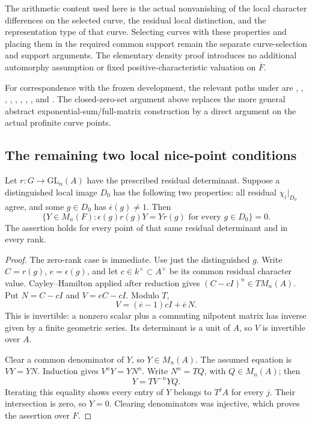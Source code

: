 The arithmetic content used here is the actual nonvanishing
of the local character differences on the selected curve,
the residual local distinction, and the representation type
of that curve.  Selecting curves with these properties and
placing them in the required common support remain the
separate curve-selection and support arguments.
The elementary density proof introduces no additional
automorphy assumption or fixed positive-characteristic
valuation on \(\overline F\).

For correspondence with the frozen development, the relevant
paths under  are
, , ,
, ,
, ,
, and
.
The closed-zero-set argument above replaces the more general
abstract exponential-sum/full-matrix construction by a direct
argument on the actual profinite curve points.


\subsection{The remaining two local nice-point conditions}
\begin{srproposition}
\label{prop:sr-curve-N4}
Let \(r:G\to\mathrm{GL}_n(A)\) have the prescribed residual
determinant. Suppose a distinguished local image \(D_0\)
has the following two properties:
all residual \(\chi_i|_{D_0}\) agree, and some \(g\in D_0\)
has \(\overline\epsilon(g)\ne1\).
Then
\[
 \{Y\in M_n(F):
      \epsilon(g)r(g)Y=Yr(g)\text{ for every }g\in D_0\}=0.
\]
The assertion holds for every point of that same residual
determinant and in every rank.
\end{srproposition}
\begin{proof}
The zero-rank case is immediate.
Use just the distinguished \(g\).
Write \(C=r(g)\), \(e=\epsilon(g)\), and let
\(c\in k^\times\subset A^\times\) be its common residual
character value.
Cayley--Hamilton applied after reduction gives
\((C-cI)^n\in T M_n(A)\).
Put \(N=C-cI\) and \(V=eC-cI\).
Modulo \(T\),
\[
                  V=(\overline e-1)cI+\overline e\,N.
\]
This is invertible: a nonzero scalar plus a commuting
nilpotent matrix has inverse given by a finite geometric
series. Its determinant is a unit of \(A\), so \(V\) is
invertible over \(A\).

Clear a common denominator of \(Y\), so \(Y\in M_n(A)\).
The assumed equation is \(VY=YN\).
Induction gives \(V^nY=YN^n\).
Write \(N^n=TQ\), with \(Q\in M_n(A)\); then
\[
                         Y=T V^{-n}YQ.
\]
Iterating this equality shows every entry of \(Y\) belongs
to \(T^jA\) for every \(j\).
Their intersection is zero, so \(Y=0\).
Clearing denominators was injective, which proves the
assertion over \(F\).
\end{proof}

